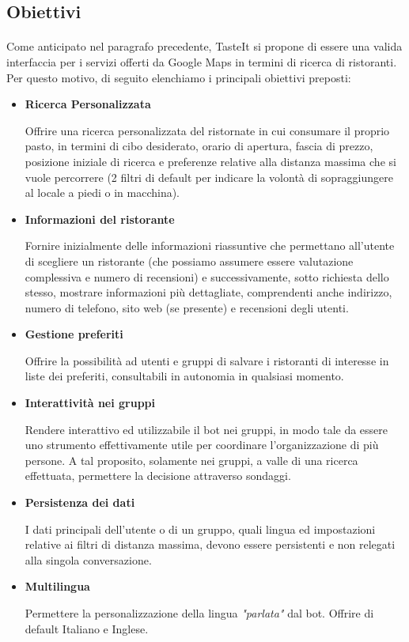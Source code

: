 \documentclass[a4paper, 12pt]{article}
\begin{document}
	\subsection{Obiettivi}
	\paragraph{}
	Come anticipato nel paragrafo precedente, TasteIt si propone di essere una valida interfaccia per i servizi offerti da Google Maps in termini di ricerca di ristoranti. Per questo motivo, di seguito elenchiamo i principali obiettivi preposti:
	\begin{itemize}
		\item \textbf{Ricerca Personalizzata}
		
		Offrire una ricerca personalizzata del ristornate in cui consumare il proprio pasto, in termini di cibo desiderato, orario di apertura, fascia di prezzo, posizione iniziale di ricerca e preferenze relative alla distanza massima che si vuole percorrere (2 filtri di default per indicare la volontà di sopraggiungere al locale a piedi o in macchina).
		
		\item \textbf{Informazioni del ristorante}
		
		Fornire inizialmente delle informazioni riassuntive che permettano all'utente di scegliere un ristorante (che possiamo assumere essere valutazione complessiva e numero di recensioni) e successivamente, sotto richiesta dello stesso, mostrare informazioni più dettagliate, comprendenti anche indirizzo, numero di telefono, sito web (se presente) e recensioni degli utenti.
		
		\item \textbf{Gestione preferiti}
		
		Offrire la possibilità ad utenti e gruppi di salvare i ristoranti di interesse in liste dei preferiti, consultabili in autonomia in qualsiasi momento.
		
		\item \textbf{Interattività nei gruppi}
		
		Rendere interattivo ed utilizzabile il bot nei gruppi, in modo tale da essere uno strumento effettivamente utile per coordinare l'organizzazione di più persone. A tal proposito, solamente nei gruppi, a valle di una ricerca effettuata, permettere la decisione attraverso sondaggi.
		
		\item \textbf{Persistenza dei dati}
		
		I dati principali dell'utente o di un gruppo, quali lingua ed impostazioni relative ai filtri di distanza massima, devono essere persistenti e non relegati alla singola conversazione.
		
		\item \textbf{Multilingua}
		
		Permettere la personalizzazione della lingua \textit{"parlata"} dal bot. Offrire di default Italiano e Inglese.
	\end{itemize}
\end{document}
